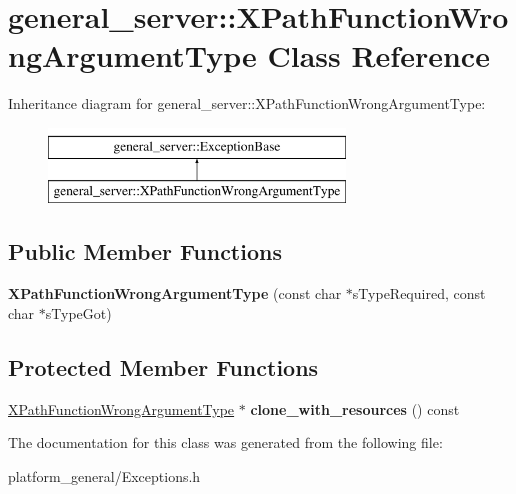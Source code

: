 \hypertarget{classgeneral__server_1_1XPathFunctionWrongArgumentType}{\section{general\-\_\-server\-:\-:\-X\-Path\-Function\-Wrong\-Argument\-Type \-Class \-Reference}
\label{classgeneral__server_1_1XPathFunctionWrongArgumentType}
}
\-Inheritance diagram for general\-\_\-server\-:\-:\-X\-Path\-Function\-Wrong\-Argument\-Type\-:\begin{figure}[H]
\begin{center}
\leavevmode
\includegraphics[height=2.000000cm]{classgeneral__server_1_1XPathFunctionWrongArgumentType}
\end{center}
\end{figure}
\subsection*{\-Public \-Member \-Functions}
\begin{DoxyCompactItemize}
\item 
\hypertarget{classgeneral__server_1_1XPathFunctionWrongArgumentType_aa14ec08d9f7dda54daa430d641ace2a9}{{\bfseries \-X\-Path\-Function\-Wrong\-Argument\-Type} (const char $\ast$s\-Type\-Required, const char $\ast$s\-Type\-Got)}\label{classgeneral__server_1_1XPathFunctionWrongArgumentType_aa14ec08d9f7dda54daa430d641ace2a9}

\end{DoxyCompactItemize}
\subsection*{\-Protected \-Member \-Functions}
\begin{DoxyCompactItemize}
\item 
\hypertarget{classgeneral__server_1_1XPathFunctionWrongArgumentType_a7dd37ae47e6854f299abe7d5387f6970}{\hyperlink{classgeneral__server_1_1XPathFunctionWrongArgumentType}{\-X\-Path\-Function\-Wrong\-Argument\-Type} $\ast$ {\bfseries clone\-\_\-with\-\_\-resources} () const }\label{classgeneral__server_1_1XPathFunctionWrongArgumentType_a7dd37ae47e6854f299abe7d5387f6970}

\end{DoxyCompactItemize}


\-The documentation for this class was generated from the following file\-:\begin{DoxyCompactItemize}
\item 
platform\-\_\-general/\-Exceptions.\-h\end{DoxyCompactItemize}
